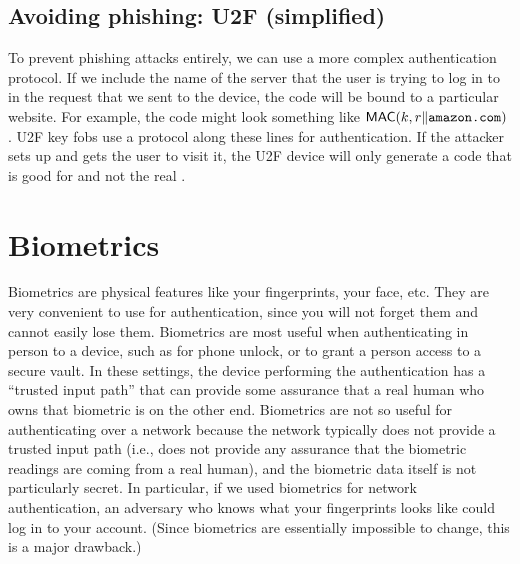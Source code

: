 \subsection{Avoiding phishing: U2F (simplified)}
To prevent phishing attacks entirely, we can use a more complex authentication protocol.
If we include the name of the server that the user is trying to log in to in the request that we sent to the device,
the code will be bound to a particular website.
For example, the code might look something like $\MAC(k, r\|\ttt{amazon.com})$.
U2F key fobs use a protocol along these lines for authentication.
If the attacker sets up  and gets the user to visit it,
the U2F device will only generate a code that is good for 
and not the real . 
	
\section{Biometrics}
Biometrics are physical features like your fingerprints, your face, etc.
They are very convenient to use for authentication, since you will not forget them and cannot easily lose them.
Biometrics are most useful when authenticating in person to a device, such as for phone unlock, or
to grant a person access to a secure vault.
In these settings, the device performing the authentication has a ``trusted input path''
that can provide some assurance that a real human who owns that biometric is on the other end.
Biometrics are not so useful for authenticating over a network because the network typically
does not provide a trusted input path (i.e., does not provide any assurance that the biometric
readings are coming from a real human), and the biometric data itself is not particularly secret.
In particular, if we used biometrics for network authentication,
an adversary who knows what your fingerprints looks like could log in to your account.
(Since biometrics are essentially impossible to change, this is a major drawback.)

